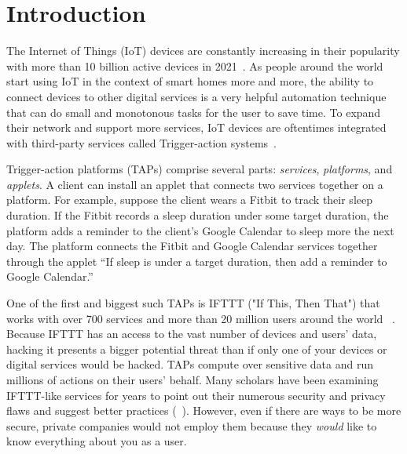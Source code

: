 \section{Introduction}
\label{sec:intro}

The Internet of Things (IoT) devices are constantly increasing in their popularity with more than 10 billion
active devices in 2021~\cite{DBLP:webpage/Bojan/IoTstats}. As people around the world start using IoT
in the context of smart homes more and more, the ability to connect devices to other digital services is a
very helpful automation technique that can do small and monotonous tasks for the user to save time. To 
expand their network and support more services, IoT devices are oftentimes integrated with third-party
services called Trigger-action systems~\cite{DBLP:journals/access/XuZZCDG19, DBLP:conf/chi/UrHBLMPSL16}.

Trigger-action platforms (TAPs) comprise several parts: \emph{services}, \emph{platforms}, and
\emph{applets}. A client can install an applet that connects two services together on a platform. For
example, suppose the client wears a Fitbit to track their sleep duration. If the Fitbit records a sleep
duration under some target duration, the platform adds a reminder to the client's Google Calendar to 
sleep more the next day. The platform connects the Fitbit and Google Calendar services together 
through the applet ``If sleep is under a target duration, then add a reminder to Google Calendar.''  

One of the first and biggest such TAPs is IFTTT ("If This, Then That") that works with
over 700 services and more than 20 million users around the world ~\cite{ifttt-website, DBLP:conf/sp/ChenCWSCF21}. 
Because IFTTT has an access to the vast number of devices and users' data, hacking it presents a
bigger potential threat than if only one of your devices or digital services would be hacked. TAPs
compute over sensitive data and run millions of actions on their users' behalf. Many scholars have been
examining IFTTT-like services for years to point out their numerous security
and privacy flaws and suggest better practices (~\cite{DBLP:conf/sp/ChenCWSCF21, DBLP:journals/corr/abs-2009-12447, DBLP:conf/imc/MiQZW17, DBLP:journals/corr/FernandesRJP17, DBLP:conf/www/SurbatovichABDJ17, DBLP:journals/access/XuZZCDG19}). 
However, even if there are ways to be more secure, private companies would not employ them because 
they \emph{would} like to know everything about you as a user.


